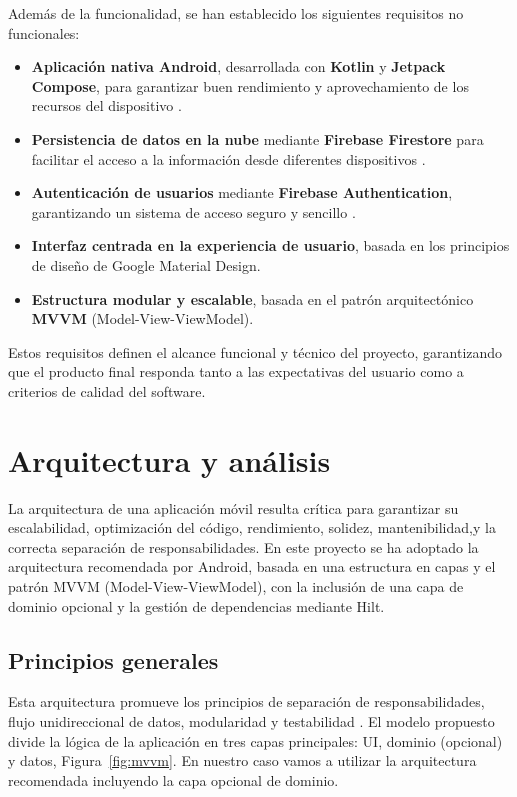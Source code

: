Además de la funcionalidad, se han establecido los siguientes requisitos no funcionales:

\begin{itemize}
    \item \textbf{Aplicación nativa Android}, desarrollada con \textbf{Kotlin} y \textbf{Jetpack Compose}, para garantizar buen rendimiento y aprovechamiento de los recursos del dispositivo \cite{kotlin,jetpack}.
    \item \textbf{Persistencia de datos en la nube} mediante \textbf{Firebase Firestore} para facilitar el acceso a la información desde diferentes dispositivos \cite{firestore}.
    \item \textbf{Autenticación de usuarios} mediante \textbf{Firebase Authentication}, garantizando un sistema de acceso seguro y sencillo \cite{firebase-auth}.
    \item \textbf{Interfaz centrada en la experiencia de usuario}, basada en los principios de diseño de Google Material Design.
    \item \textbf{Estructura modular y escalable}, basada en el patrón arquitectónico \textbf{MVVM} (Model-View-ViewModel).
\end{itemize}

Estos requisitos definen el alcance funcional y técnico del proyecto, garantizando que el producto final responda tanto a las expectativas del usuario como a criterios de calidad del software.


\section{Arquitectura y análisis}
\label{sec:arquitectura-analisis}

La arquitectura de una aplicación móvil resulta crítica para garantizar su escalabilidad, optimización del código, rendimiento, solidez, mantenibilidad,y la correcta separación de responsabilidades. En este proyecto se ha adoptado la arquitectura recomendada por Android, basada en una estructura en capas y el patrón MVVM (Model-View-ViewModel), con la inclusión de una capa de dominio opcional y la gestión de dependencias mediante Hilt.

\subsection{Principios generales}

Esta arquitectura promueve los principios de separación de responsabilidades, flujo unidireccional de datos, modularidad y testabilidad \cite{android-architecture}. El modelo propuesto divide la lógica de la aplicación en tres capas principales: UI, dominio (opcional) y datos, Figura~\ref{fig:mvvm}. En nuestro caso vamos a utilizar la arquitectura recomendada incluyendo la capa opcional de dominio.

